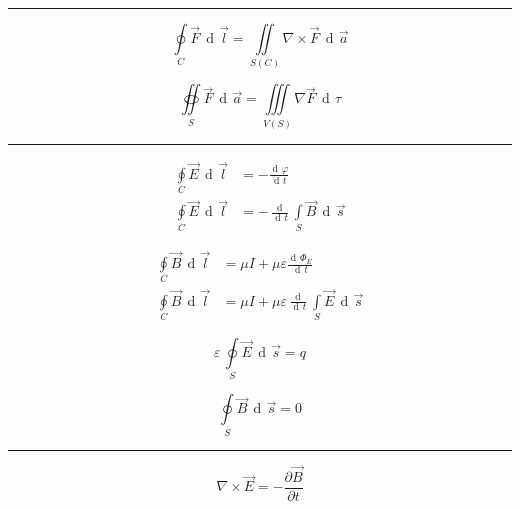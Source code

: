 \documentclass[12pt]{article}
\DeclareMathOperator{\der}{\operatorname{d}\!}
\newcommand{\grayrule}{{\color{lightgray} \hrule}}
\begin{document}
\begin{multicols}{3}
\grayrule
{ \color{m-gray}

    \begin{equation*}
        \oint\limits_C \Vec{F}\,\der \Vec{l}
            = \iint\limits_{S(C)} \nabla \times \Vec{F}\,\der\Vec{a} 
    \end{equation*}
    
    \begin{equation*}
        \oiint\limits_S \Vec{F} \, \der \Vec{a} = \iiint\limits_{V(S)} \nabla \Vec{F} \, \der\tau
    \end{equation*}
    
    \grayrule
    
    \begin{equation*}
        \begin{split}
            \oint\limits_C \Vec{E} \, \der\Vec{l} &= - \frac{\der\varphi}{\der t}\\
            \oint\limits_C \Vec{E} \, \der\Vec{l}
                &= - \frac{\der}{\der t} \int\limits_S \Vec{B} \, \der\Vec{s}
        \end{split}
    \end{equation*}
    
    \begin{equation*}
        \begin{split}
            \oint\limits_C \Vec{B} \, \der\Vec{l}
                &= \mu I + \mu \varepsilon \frac{\der\Phi_E}{\der t}\\
            \oint\limits_C \Vec{B} \, \der\Vec{l}
                &= \mu I + \mu \varepsilon \frac{\der}{\der t} \int\limits_S \Vec{E} \, \der\Vec{s}
        \end{split}
    \end{equation*}
    
    \begin{equation*}
        \varepsilon \, \oint\limits_S \Vec{E} \, \der\Vec{s} = q
    \end{equation*}
    
    \begin{equation*}
        \oint\limits_S \Vec{B} \, \der\Vec{s} = 0
    \end{equation*}

}
\grayrule

\begin{equation*}
    \nabla \times \Vec{E} = - \frac{\partial \Vec{B}}{\partial t}
\end{equation*}


\end{multicols}
\end{document}
